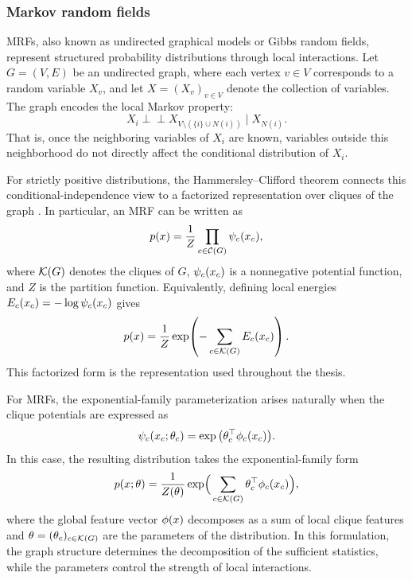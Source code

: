 \subsubsection{Markov random fields}

MRFs, also known as undirected graphical models or Gibbs random fields, represent structured probability distributions through local interactions. Let $G=(V,E)$ be an undirected graph, where each vertex $v\in V$ corresponds to a random variable $X_v$, and let $X=(X_v)_{v\in V}$ denote the collection of variables. The graph encodes the local Markov property:
\begin{equation}
X_i \perp\!\!\!\perp X_{V\setminus(\{i\}\cup N(i))}\mid X_{N(i)} .
\end{equation}
That is, once the neighboring variables of $X_i$ are known, variables outside this neighborhood do not directly affect the conditional distribution of $X_i$.

For strictly positive distributions, the Hammersley--Clifford theorem connects this conditional-independence view to a factorized representation over cliques of the graph \citep{besag_spatial_1974,grimmett_theorem_1973,grimmett_disorder_1990}. In particular, an MRF can be written as
\begin{equation}
p(x)=\frac{1}{Z}\prod_{c\in\mathcal{C}(G)}\psi_c(x_c),
\end{equation}
where $\mathcal{K}(G)$ denotes the cliques of $G$, $\psi_c(x_c)$ is a nonnegative potential function, and $Z$ is the partition function. Equivalently, defining local energies $E_c(x_c)=-\log \psi_c(x_c)$ gives
\begin{equation}
p(x)=\frac{1}{Z}\exp\!\left(-\sum_{c\in\mathcal{K}(G)}E_c(x_c)\right).
\end{equation}
This factorized form is the representation used throughout the thesis.

For MRFs, the exponential-family parameterization arises naturally when the clique potentials are expressed as
\begin{equation}
\psi_c(x_c;\theta_c) = \exp\big(\theta_c^\top \phi_c(x_c)\big).
\end{equation}
In this case, the resulting distribution takes the exponential-family form
\begin{equation}
p(x;\theta)=\frac{1}{Z(\theta)}\exp\!\Big(\sum_{c\in\mathcal{K}(G)} \theta_c^\top \phi_c(x_c)\Big),
\end{equation}
where the global feature vector $\phi(x)$ decomposes as a sum of local clique features and $\theta = (\theta_c)_{c\in \mathcal{K}(G)}$ are the parameters of the distribution. In this formulation, the graph structure determines the decomposition of the sufficient statistics, while the parameters control the strength of local interactions.


